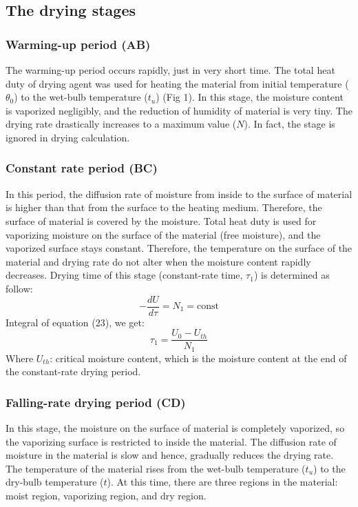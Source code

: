 \subsection{The drying stages}
\subsubsection{Warming-up period (AB)}
The warming-up period occurs rapidly, just in very short time. The total heat duty of drying agent was used for heating the material from initial temperature ($\theta_0$) to the wet-bulb temperature ($t_u$) (Fig 1).
In this stage, the moisture content is vaporized negligibly, and the reduction of humidity of material is very tiny. The drying rate drastically increases to a maximum value ($N$). In fact, the stage is ignored in drying calculation.

\subsubsection{Constant rate period (BC)}
In this period, the diffusion rate of moisture from inside to the surface of material is higher than that from the surface to the heating medium. Therefore, the surface of material is covered by the moisture.
Total heat duty is used for vaporizing moisture on the surface of the material (free moisture), and the vaporized surface stays constant. Therefore, the temperature on the surface of the material and drying rate do not alter when the moisture content rapidly decreases.
Drying time of this stage (constant-rate time, $\tau_1$) is determined as follow:
\begin{equation}
    -\frac{dU}{d\tau} = N_1 = \text{const}
\end{equation}
Integral of equation (23), we get:
\begin{equation}
    \tau_1 = \frac{U_0 - U_{th}}{N_1}
\end{equation}
Where $U_{th}$: critical moisture content, which is the moisture content at the end of the constant-rate drying period.

\subsubsection{Falling-rate drying period (CD)}
In this stage, the moisture on the surface of material is completely vaporized, so the vaporizing surface is restricted to inside the material. The diffusion rate of moisture in the material is slow and hence, gradually reduces the drying rate. The temperature of the material rises from the wet-bulb temperature ($t_u$) to the dry-bulb temperature ($t$). At this time, there are three regions in the material: moist region, vaporizing region, and dry region.

